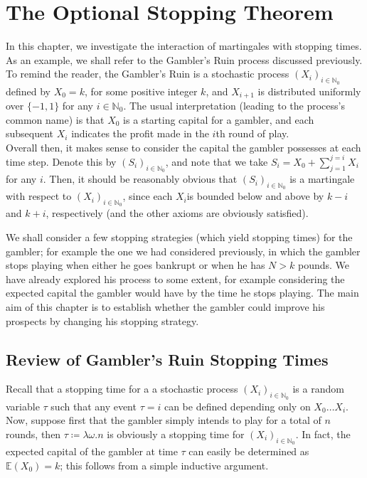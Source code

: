 \chapter{The Optional Stopping Theorem}

In this chapter, we investigate the interaction of martingales with stopping times. As an example, 
we shall refer to the Gambler's Ruin process discussed previously. To remind the reader, the 
Gambler's Ruin is a stochastic process $(X_i)_{i\in\mathbb{N}_0}$ defined by $X_0 = k$, for some 
positive integer $k$, and $X_{i+1}$ is distributed uniformly over $\{-1, 1\}$ for any $i \in 
\mathbb{N}_0$. The usual interpretation (leading to the process's common name) is that $X_0$ is a 
starting capital for a gambler, and each subsequent $X_i$ indicates the profit made in the $i$th 
round of play. \\
Overall then, it makes sense to consider the capital the gambler possesses at each time step. 
Denote this by $(S_i)_{i\in \mathbb{N}_0}$, and note that we take $S_i = X_0 + \sum_{j=1}^{j=i}X_i$
for any $i$. Then, it should be reasonably obvious that $(S_i)_{i\in\mathbb{N}_0}$ is a martingale
with respect to $(X_i)_{i\in\mathbb{N}_0}$, since each $X_i$is bounded below and above by $k-i$ and
$k+i$, respectively (and the other axioms are obviously satisfied). 

We shall consider a few stopping strategies (which yield stopping times) for the gambler; for 
example the one we had considered previously, in which the gambler stops playing when either he 
goes bankrupt or when he has $N > k$ pounds. We have already explored his process to some extent, 
for example considering the expected capital the gambler would have by the time he stops playing. 
The main aim of this chapter is to establish whether the gambler could improve his prospects by 
changing his stopping strategy.

\section{Review of Gambler's Ruin Stopping Times}
	Recall that a stopping time for a a stochastic process $(X_i)_{i\in \mathbb{N}_0}$ is a 
	random variable $\tau$ such that any event $\tau = i$ can be defined depending only on $X_0
	\hdots X_i$. \\
	Now, suppose first that the gambler simply intends to play for a total of $n$ rounds, then 
	$\tau \coloneqq \lambda \omega . n$ is obviously a stopping time for 
	$(X_i)_{i\in\mathbb{N}_0}$. In fact, the expected capital of the gambler at time $\tau$ can
	easily be determined as $\mathbb{E}(X_0) = k$; this follows from a simple inductive 
	argument. 


